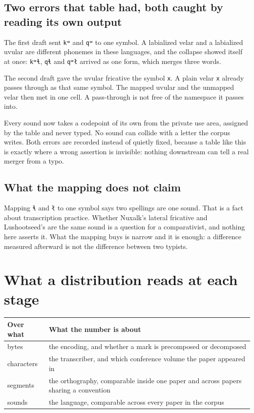 \subsection{Two errors that table had, both caught by reading its own output}

The first draft sent \texttt{kʷ} and \texttt{qʷ} to one symbol. A labialized velar and a labialized
uvular are different phonemes in these languages, and the collapse showed itself at once:
\texttt{kʷɬ}, \texttt{qɬ} and \texttt{qʷł} arrived as one form, which merges three words.

The second draft gave the uvular fricative the symbol \texttt{x}. A plain velar \texttt{x} already
passes through as that same symbol. The mapped uvular and the unmapped velar then met in one cell.
A pass-through is not free of the namespace it passes into.

Every sound now takes a codepoint of its own from the private use area, assigned by the table and
never typed. No sound can collide with a letter the corpus writes. Both errors are recorded
instead of quietly fixed, because a table like this is exactly where a wrong assertion is invisible:
nothing downstream can tell a real merger from a typo.

\subsection{What the mapping does not claim}

Mapping \texttt{ɬ} and \texttt{ł} to one symbol says two spellings are one sound. That is a fact
about transcription practice. Whether Nuxalk's lateral fricative and Lushootseed's are the same
sound is a question for a comparativist, and nothing here asserts it. What the mapping buys is
narrow and it is enough: a difference measured afterward is not the difference between two typists.

\section{What a distribution reads at each stage}

\tiny
\setlength{\tabcolsep}{2pt}
\begin{longtable}{@{}>{\arraybackslash}p{}>{\arraybackslash}p{}@{}}
\toprule
Over what & What the number is about \\
\midrule
bytes & the encoding, and whether a mark is precomposed or decomposed \\
characters & the transcriber, and which conference volume the paper appeared in \\
segments & the orthography, comparable inside one paper and across papers sharing a convention \\
sounds & the language, comparable across every paper in the corpus \\
\bottomrule
\end{longtable}
\normalsize

